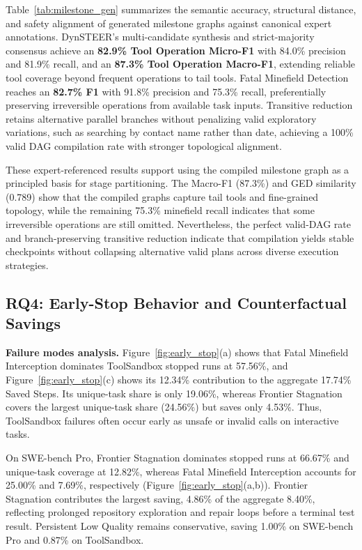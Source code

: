 Table~\ref{tab:milestone_gen} summarizes the semantic accuracy, structural distance, and safety alignment of generated milestone graphs against canonical expert annotations.
DynSTEER's multi-candidate synthesis and strict-majority consensus achieve an \textbf{82.9\% Tool Operation Micro-F1} with 84.0\% precision and 81.9\% recall, and an \textbf{87.3\% Tool Operation Macro-F1}, extending reliable tool coverage beyond frequent operations to tail tools.
Fatal Minefield Detection reaches an \textbf{82.7\% F1} with 91.8\% precision and 75.3\% recall, preferentially preserving irreversible operations from available task inputs.
Transitive reduction retains alternative parallel branches without penalizing valid exploratory variations, such as searching by contact name rather than date, achieving a 100\% valid DAG compilation rate with stronger topological alignment.

These expert-referenced results support using the compiled milestone graph as a principled basis for stage partitioning. The Macro-F1 (87.3\%) and GED similarity (0.789) show that the compiled graphs capture tail tools and fine-grained topology, while the remaining 75.3\% minefield recall indicates that some irreversible operations are still omitted. Nevertheless, the perfect valid-DAG rate and branch-preserving transitive reduction indicate that compilation yields stable checkpoints without collapsing alternative valid plans across diverse execution strategies.

\subsection{RQ4: Early-Stop Behavior and Counterfactual Savings}
\label{sec:exp_rq4}



\textbf{Failure modes analysis.} Figure~\ref{fig:early_stop}(a) shows that Fatal Minefield Interception dominates ToolSandbox stopped runs at 57.56\%, and Figure~\ref{fig:early_stop}(c) shows its 12.34\% contribution to the aggregate 17.74\% Saved Steps. 
Its unique-task share is only 19.06\%, whereas Frontier Stagnation covers the largest unique-task share (24.56\%) but saves only 4.53\%. 
Thus, ToolSandbox failures often occur early as unsafe or invalid calls on interactive tasks.

On SWE-bench Pro, Frontier Stagnation dominates stopped runs at 66.67\% and unique-task coverage at 12.82\%, whereas Fatal Minefield Interception accounts for 25.00\% and 7.69\%, respectively (Figure~\ref{fig:early_stop}(a,b)). Frontier Stagnation contributes the largest saving, 4.86\% of the aggregate 8.40\%, reflecting prolonged repository exploration and repair loops before a terminal test result. Persistent Low Quality remains conservative, saving 1.00\% on SWE-bench Pro and 0.87\% on ToolSandbox.

